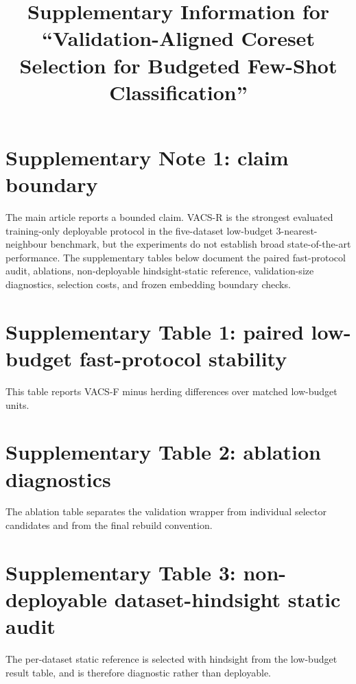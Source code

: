 \documentclass[12pt]{article}
\title{Supplementary Information for ``Validation-Aligned Coreset Selection for Budgeted Few-Shot Classification''}
\author{}
\date{}
\begin{document}
\maketitle

\section*{Supplementary Note 1: claim boundary}

The main article reports a bounded claim. VACS-R is the strongest evaluated training-only deployable protocol in the five-dataset low-budget 3-nearest-neighbour benchmark, but the experiments do not establish broad state-of-the-art performance. The supplementary tables below document the paired fast-protocol audit, ablations, non-deployable hindsight-static reference, validation-size diagnostics, selection costs, and frozen embedding boundary checks.

\section*{Supplementary Table 1: paired low-budget fast-protocol stability}

This table reports VACS-F minus herding differences over matched low-budget units.

\begin{center}
\scriptsize
\setlength{\tabcolsep}{2.2pt}
\resizebox{0.90\linewidth}{!}{}
\end{center}

\section*{Supplementary Table 2: ablation diagnostics}

The ablation table separates the validation wrapper from individual selector candidates and from the final rebuild convention.

\begin{center}
\small
\resizebox{0.80\linewidth}{!}{}
\end{center}

\section*{Supplementary Table 3: non-deployable dataset-hindsight static audit}

The per-dataset static reference is selected with hindsight from the low-budget result table, and is therefore diagnostic rather than deployable.
\end{document}
